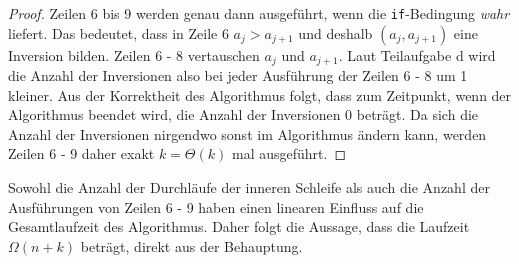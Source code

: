 \documentclass[11pt,a4paper]{article}
\begin{document}
\begin{loesung}
\begin{enumerate}
\begin{proof}
            Zeilen 6 bis 9 werden genau dann ausgeführt, wenn die \texttt{if}-Bedingung \textit{wahr} liefert.
            Das bedeutet, dass in Zeile 6 $a_j > a_{j + 1}$ und deshalb $(a_j, a_{j + 1})$ eine Inversion bilden.
            Zeilen 6 - 8 vertauschen $a_j$ und $a_{j + 1}$.
            Laut Teilaufgabe d wird die Anzahl der Inversionen also bei jeder Ausführung der Zeilen 6 - 8 um 1 kleiner.
            Aus der Korrektheit des Algorithmus folgt, dass zum Zeitpunkt, wenn der Algorithmus beendet wird, die Anzahl der Inversionen 0 beträgt.
            Da sich die Anzahl der Inversionen nirgendwo sonst im Algorithmus ändern kann, werden Zeilen 6 - 9 daher exakt $k = \Theta(k)$ mal ausgeführt.
        \end{proof}
        Sowohl die Anzahl der Durchläufe der inneren Schleife als auch die Anzahl der Ausführungen von Zeilen 6 - 9 haben einen linearen Einfluss auf die Gesamtlaufzeit des Algorithmus. Daher folgt die Aussage, dass die Laufzeit $\Omega(n + k)$ beträgt, direkt aus der Behauptung.
    \end{enumerate}
\end{loesung}
\end{document}
